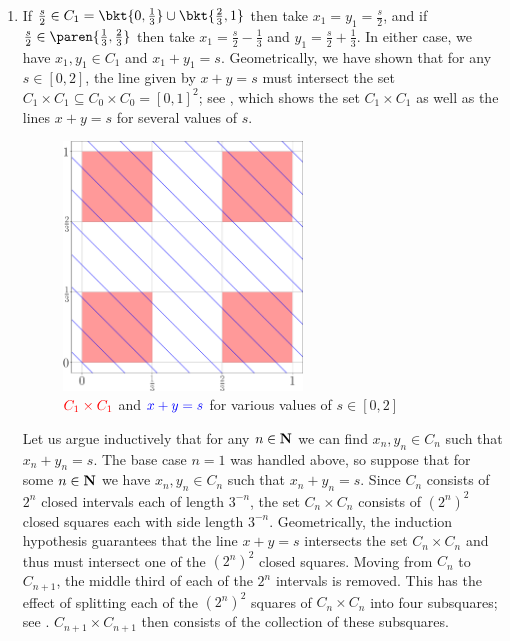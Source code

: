 \documentclass{lew98_solutions}
\begin{document}
\begin{solution}
    \begin{enumerate}
        \item If \( \tfrac{s}{2} \in C_1 = \bkt{ 0, \tfrac{1}{3} } \cup \bkt{ \tfrac{2}{3}, 1 } \) then take \( x_1 = y_1 = \tfrac{s}{2} \), and if \( \tfrac{s}{2} \in \paren{ \tfrac{1}{3}, \tfrac{2}{3} } \) then take \( x_1 = \tfrac{s}{2} - \tfrac{1}{3} \) and \( y_1 = \tfrac{s}{2} + \tfrac{1}{3} \). In either case, we have \( x_1, y_1 \in C_1 \) and \( x_1 + y_1 = s \). Geometrically, we have shown that for any \( s \in [0, 2] \), the line given by \( x + y = s \) must intersect the set \( C_1 \times C_1 \subseteq C_0 \times C_0 = [0, 1]^2 \); see , which shows the set \( C_1 \times C_1 \) as well as the lines \( x + y = s \) for several values of \( s \).

        \begin{figure}[H]
            \centering
            \includegraphics[width=0.6\textwidth]{UA_Figures/UA_ex3_3_7_fig_1.pdf}
            \caption{\( \textcolor{red}{C_1 \times C_1} \) and \( \textcolor{blue}{x + y = s} \) for various values of \( s \in [0, 2] \)}
            \label{fig:ex3.3.7_1}
        \end{figure}

        Let us argue inductively that for any \( n \in \mathbf{N} \) we can find \( x_n, y_n \in C_n \) such that \( x_n + y_n = s \). The base case \( n = 1 \) was handled above, so suppose that for some \( n \in \mathbf{N} \) we have \( x_n, y_n \in C_n \) such that \( x_n + y_n = s \). Since \( C_n \) consists of \( 2^n \) closed intervals each of length \( 3^{-n} \), the set \( C_n \times C_n \) consists of \( (2^n)^2 \) closed squares each with side length \( 3^{-n} \). Geometrically, the induction hypothesis guarantees that the line \( x + y = s \) intersects the set \( C_n \times C_n \) and thus must intersect one of the \( (2^n)^2 \) closed squares. Moving from \( C_n \) to \( C_{n+1} \), the middle third of each of the \( 2^n \) intervals is removed. This has the effect of splitting each of the \( (2^n)^2 \) squares of \( C_n \times C_n \) into four subsquares; see . \( C_{n+1} \times C_{n+1} \) then consists of the collection of these subsquares.
        

\end{enumerate}
\end{solution}
\end{document}
